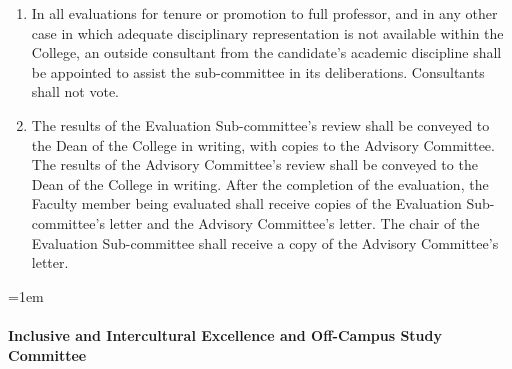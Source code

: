 \documentclass{manual}
\let\oldparagraph\paragraph
\renewcommand\paragraph{\leftskip=1em\oldparagraph}
\newcommand{\itemLevelA}{\alph*.}
\newcommand{\itemLevelB}{\arabic*)}
\newcommand{\itemRefA}{\alph*}
\newcommand{\itemRefB}{\arabic*}
\begin{document}
\begin{enumerate}[label=\itemLevelA,ref=\itemRefA]
\begin{enumerate}[label=\itemLevelB,ref=\itemRefB]
\item In all evaluations for tenure or promotion to full professor, and in any other case in which adequate disciplinary representation is not available within the College, an outside consultant from the candidate's academic discipline shall be appointed to assist the sub-committee in its deliberations. Consultants shall not vote.
\item \label{item:results09} The results of the Evaluation Sub-committee's review shall be conveyed to the Dean of the College in writing, with copies to the Advisory Committee. The results of the Advisory Committee's review shall be conveyed to the Dean of the College in writing. After the completion of the evaluation, the Faculty member being evaluated shall receive copies of the Evaluation Sub-committee's letter and the Advisory Committee's letter. The chair of the Evaluation Sub-committee shall receive a copy of the Advisory Committee's letter.

\end{enumerate}
\end{enumerate}

\paragraph{Inclusive and Intercultural Excellence and Off-Campus Study Committee}
\end{document}
